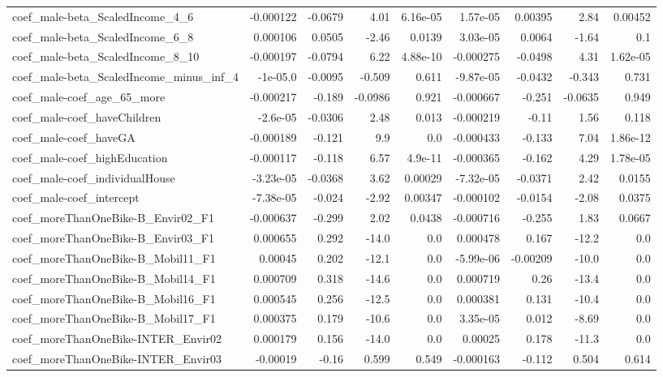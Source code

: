 \begin{tabular}{lrrrrrrrr}
coef_male-beta_ScaledIncome_4_6 & -0.000122 & -0.0679 & 4.01 & 6.16e-05 & 1.57e-05 & 0.00395 & 2.84 & 0.00452 \\
coef_male-beta_ScaledIncome_6_8 & 0.000106 & 0.0505 & -2.46 & 0.0139 & 3.03e-05 & 0.0064 & -1.64 & 0.1 \\
coef_male-beta_ScaledIncome_8_10 & -0.000197 & -0.0794 & 6.22 & 4.88e-10 & -0.000275 & -0.0498 & 4.31 & 1.62e-05 \\
coef_male-beta_ScaledIncome_minus_inf_4 & -1e-05.0 & -0.0095 & -0.509 & 0.611 & -9.87e-05 & -0.0432 & -0.343 & 0.731 \\
coef_male-coef_age_65_more & -0.000217 & -0.189 & -0.0986 & 0.921 & -0.000667 & -0.251 & -0.0635 & 0.949 \\
coef_male-coef_haveChildren & -2.6e-05 & -0.0306 & 2.48 & 0.013 & -0.000219 & -0.11 & 1.56 & 0.118 \\
coef_male-coef_haveGA & -0.000189 & -0.121 & 9.9 & 0.0 & -0.000433 & -0.133 & 7.04 & 1.86e-12 \\
coef_male-coef_highEducation & -0.000117 & -0.118 & 6.57 & 4.9e-11 & -0.000365 & -0.162 & 4.29 & 1.78e-05 \\
coef_male-coef_individualHouse & -3.23e-05 & -0.0368 & 3.62 & 0.00029 & -7.32e-05 & -0.0371 & 2.42 & 0.0155 \\
coef_male-coef_intercept & -7.38e-05 & -0.024 & -2.92 & 0.00347 & -0.000102 & -0.0154 & -2.08 & 0.0375 \\
coef_moreThanOneBike-B_Envir02_F1 & -0.000637 & -0.299 & 2.02 & 0.0438 & -0.000716 & -0.255 & 1.83 & 0.0667 \\
coef_moreThanOneBike-B_Envir03_F1 & 0.000655 & 0.292 & -14.0 & 0.0 & 0.000478 & 0.167 & -12.2 & 0.0 \\
coef_moreThanOneBike-B_Mobil11_F1 & 0.00045 & 0.202 & -12.1 & 0.0 & -5.99e-06 & -0.00209 & -10.0 & 0.0 \\
coef_moreThanOneBike-B_Mobil14_F1 & 0.000709 & 0.318 & -14.6 & 0.0 & 0.000719 & 0.26 & -13.4 & 0.0 \\
coef_moreThanOneBike-B_Mobil16_F1 & 0.000545 & 0.256 & -12.5 & 0.0 & 0.000381 & 0.131 & -10.4 & 0.0 \\
coef_moreThanOneBike-B_Mobil17_F1 & 0.000375 & 0.179 & -10.6 & 0.0 & 3.35e-05 & 0.012 & -8.69 & 0.0 \\
coef_moreThanOneBike-INTER_Envir02 & 0.000179 & 0.156 & -14.0 & 0.0 & 0.00025 & 0.178 & -11.3 & 0.0 \\
coef_moreThanOneBike-INTER_Envir03 & -0.00019 & -0.16 & 0.599 & 0.549 & -0.000163 & -0.112 & 0.504 & 0.614 \\

\end{tabular}
